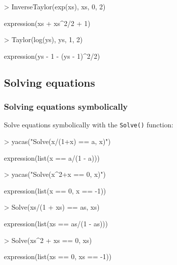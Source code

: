 \documentclass[]{article}
\newcommand{\code}[1]{{\tt #1}}
\begin{document}
\begin{Schunk}
\begin{Sinput}
> InverseTaylor(exp(xs), xs, 0, 2)
\end{Sinput}
\begin{Soutput}
expression(xs + xs^2/2 + 1)
\end{Soutput}
\begin{Sinput}
> Taylor(log(ys), ys, 1, 2)
\end{Sinput}
\begin{Soutput}
expression(ys - 1 - (ys - 1)^2/2)
\end{Soutput}
\end{Schunk}

\subsection{Solving equations}


\subsubsection{Solving equations symbolically}

Solve equations symbolically with the \code{Solve()} function:
\begin{Schunk}
\begin{Sinput}
> yacas("Solve(x/(1+x) == a, x)")
\end{Sinput}
\begin{Soutput}
expression(list(x == a/(1 - a)))
\end{Soutput}
\begin{Sinput}
> yacas("Solve(x^2+x == 0, x)")
\end{Sinput}
\begin{Soutput}
expression(list(x == 0, x == -1))
\end{Soutput}
\end{Schunk}

\begin{Schunk}
\begin{Sinput}
> Solve(xs/(1 + xs) == as, xs)
\end{Sinput}
\begin{Soutput}
expression(list(xs == as/(1 - as)))
\end{Soutput}
\begin{Sinput}
> Solve(xs^2 + xs == 0, xs)
\end{Sinput}
\begin{Soutput}
expression(list(xs == 0, xs == -1))
\end{Soutput}
\end{Schunk}
\end{document}

